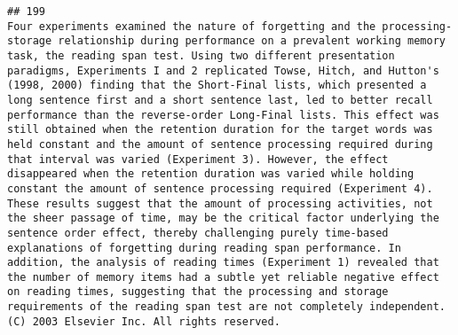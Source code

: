 \documentclass[
  english,
  man]{apa6}
\begin{document}
\begin{verbatim}
## 199                                                                                                                                                                                                                                                                                                                                                                                                                                                                                                                                                                                                                                                                                                                                                                                                                                                                                                                                                                                                                                                                                                                                                                                                                                       Four experiments examined the nature of forgetting and the processing-storage relationship during performance on a prevalent working memory task, the reading span test. Using two different presentation paradigms, Experiments I and 2 replicated Towse, Hitch, and Hutton's (1998, 2000) finding that the Short-Final lists, which presented a long sentence first and a short sentence last, led to better recall performance than the reverse-order Long-Final lists. This effect was still obtained when the retention duration for the target words was held constant and the amount of sentence processing required during that interval was varied (Experiment 3). However, the effect disappeared when the retention duration was varied while holding constant the amount of sentence processing required (Experiment 4). These results suggest that the amount of processing activities, not the sheer passage of time, may be the critical factor underlying the sentence order effect, thereby challenging purely time-based explanations of forgetting during reading span performance. In addition, the analysis of reading times (Experiment 1) revealed that the number of memory items had a subtle yet reliable negative effect on reading times, suggesting that the processing and storage requirements of the reading span test are not completely independent. (C) 2003 Elsevier Inc. All rights reserved.

\end{verbatim}
\end{document}
